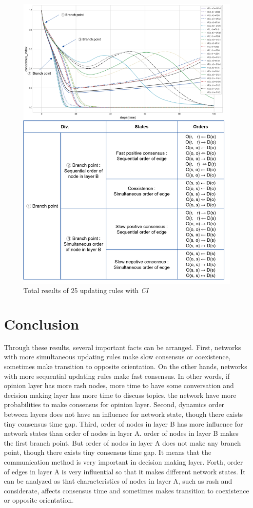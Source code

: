 \begin{figure}[!htb]
	\centering
	\includegraphics[width=\hsize]{figure/chap4_ordertotal2.png}
	\caption{Total results of 25 updating rules with \textit{CI}}
	\label{ordertotal2}
\end{figure}

\section{Conclusion}
Through these results, several important facts can be arranged. First, networks with more simultaneous updating rules make slow consensus or coexistence, sometimes make transition to opposite orientation. On the other hands, networks with more sequential updating rules make fast consensus. In other words, if opinion layer has more rash nodes, more time to have some conversation and decision making layer has more time to  discuss topics, the network have more probabilities to make consensus for opinion layer. Second, dynamics order between layers does not have an influence for network state, though there exists tiny consensus time gap. Third, order of nodes in layer B has more influence for network states than order of nodes in layer A. order of nodes in layer B makes the first branch point. But order of nodes in layer A does not make any branch point, though there exists tiny consensus time gap. It means that the communication method is very important in decision making layer. Forth, order of edges in layer A is very influential so that it makes different network states. It can be analyzed as that characteristics of nodes in layer A, such as rash and considerate, affects consensus time and sometimes makes transition to coexistence or opposite orientation. 